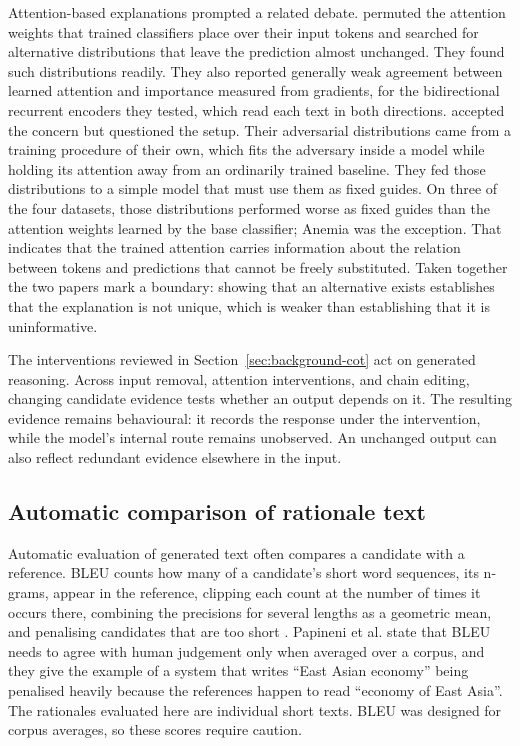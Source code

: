 Attention-based explanations prompted a related debate.
\citet{JainWallace19Attention} permuted the attention weights that trained
classifiers place over their input tokens and searched for alternative
distributions that leave the prediction almost unchanged. They found such
distributions readily. They also reported generally weak agreement between learned
attention and importance measured from gradients, for the bidirectional recurrent
encoders they tested, which read each text in both directions.
\citet{DBLP:conf/emnlp/WiegreffeP19} accepted the concern
but questioned the setup. Their adversarial distributions came from a training
procedure of their own, which fits the adversary inside a model while holding its
attention away from an ordinarily trained baseline. They fed those distributions to
a simple model that must use them as fixed guides. On three of the four datasets,
those distributions performed worse as fixed guides than the attention weights
learned by the base classifier; Anemia was the exception. That indicates that the
trained attention carries information about the relation between tokens and
predictions that cannot be freely substituted. Taken together the two papers mark
a boundary: showing that an
alternative exists establishes that the explanation is not unique, which is weaker
than establishing that it is uninformative.

The interventions reviewed in Section~\ref{sec:background-cot} act on generated
reasoning. Across input removal, attention interventions, and chain editing,
changing candidate evidence tests whether an output depends on it. The resulting
evidence remains behavioural: it records the response under the intervention,
while the model's internal route remains unobserved. An unchanged output can also
reflect redundant evidence elsewhere in the input.

\subsection{Automatic comparison of rationale text}
\label{sec:background-metrics}

Automatic evaluation of generated text often compares a candidate with a
reference. BLEU counts how many of a candidate's short word sequences, its
n-grams, appear in the reference,
clipping each count at the number of times it occurs there, combining the
precisions for several lengths as a geometric mean, and penalising candidates that
are too short \citep{DBLP:conf/acl/PapineniRWZ02}. Papineni et al. state that BLEU needs
to agree with human judgement only when averaged over a corpus, and they give the
example of a system that writes \enquote{East Asian
economy} being penalised heavily because the references happen to read
\enquote{economy of East Asia}. The rationales evaluated here are individual
short texts. BLEU was designed for corpus averages, so these scores require
caution.

